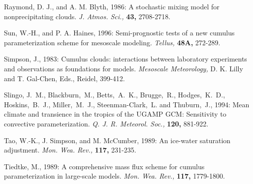 \por
Raymond, D. J., and A. M. Blyth, 1986: A stochastic mixing model for
nonprecipitating clouds.
{\it J. Atmos. Sci.,} {\bf 43,} 2708-2718.


\por
Sun, W.-H., and P. A. Haines, 1996: Semi-prognostic tests of a new cumulus
parameterization scheme for mesoscale modeling.
{\it Tellus,} {\bf 48A,} 272-289.




\por
Simpson, J., 1983: Cumulus clouds: interactions between laboratory
experiments and observations as foundations for models.
{\it Mesoscale Meteorology,} D. K. Lilly and T. Gal-Chen, Eds., Reidel,
399-412.

\por
Slingo, J.~M., Blackburn,~M., Betts,~A.~K., Brugge,~R.,
Hodges,~K.~D., Hoskins,~B.~J.,
Miller,~M.~J., Steenman-Clark,~L. and Thuburn,~J.,
1994:
Mean climate and
transience in the tropics of the UGAMP GCM: Sensitivity to convective
parameterization. {\it Q. J. R. Meteorol. Soc.,} {\bf 120,} 881-922.


\por
Tao, W.-K., J. Simpson, and M. McCumber, 1989: An ice-water
saturation adjustment. {\it Mon. Wea. Rev.,} {\bf 117,} 231-235.

\por
Tiedtke, M., 1989: A comprehensive mass flux scheme for cumulus
parameterization in large-scale models.
{\it Mon. Wea. Rev.,} {\bf 117,} 1779-1800.

